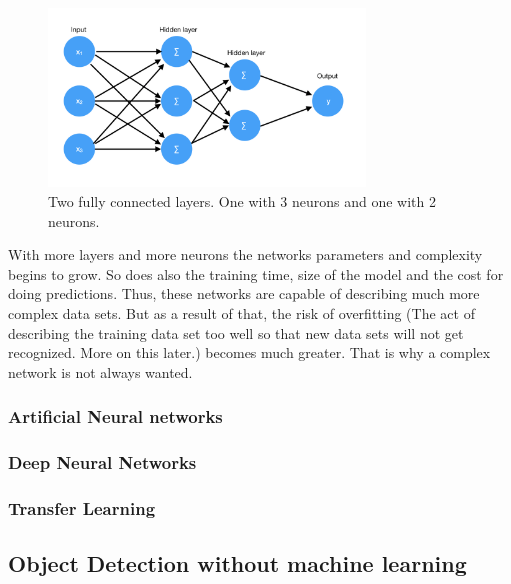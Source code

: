 \begin{figure}[hbtp]
\begin{center}
\includegraphics[width = 0.75\textwidth]{./Images/fully_connected.jpg} 
\caption{Two fully connected layers. One with 3 neurons and one with 2 neurons.}
\end{center}
\end{figure}

With more layers and more neurons the networks parameters and complexity begins to grow. So does also the training time, size of the model and the cost for doing predictions. Thus, these networks are capable of describing much more complex data sets. But as a result of that, the risk of overfitting (The act of describing the training data set too well so that new data sets will not get recognized. More on this later.) becomes much greater. That is why a complex network is not always wanted.

\subsubsection{Artificial Neural networks}

\subsubsection{Deep Neural Networks}

\subsubsection{Transfer Learning}


\subsection{Object Detection without machine learning}

